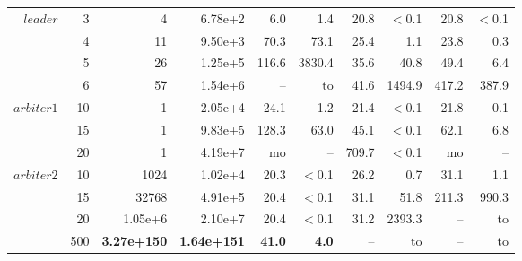 \begin{tabular}{|r|r|r|r|r| r|r|r|r|r|}
\hline
\multirow{4}{*}{$leader$} &3  &4  &6.78e+2        &6.0    &1.4        &20.8   &$<$0.1     &20.8   &$<$0.1 \\
                          &4  &11 &9.50e+3        &70.3   &73.1       &25.4   &1.1        &23.8   &0.3  \\
                          &5  &26 &1.25e+5        &116.6  &3830.4     &35.6   &40.8       &49.4   &6.4  \\
                          &6  &57 &1.54e+6        &--     &to         &41.6   &1494.9     &417.2  &387.9 \\
\hline
\multirow{3}{*}{$arbiter1$} &10 &1  &2.05e+4        &24.1   &1.2        &21.4   &$<$0.1     &21.8   &0.1 \\
                            &15 &1  &9.83e+5        &128.3  &63.0       &45.1   &$<$0.1     &62.1   &6.8 \\
                            &20 &1  &4.19e+7        &mo     &--         &709.7  &$<$0.1     &mo     &--  \\
\hline
\multirow{4}{*}{$arbiter2$} 	&10 	& 1024          & 1.02e+4           &20.3       &$<$0.1     &26.2       &0.7        &31.1       & 1.1   \\
                        	&15 	& 32768         & 4.91e+5           &20.4       &$<$0.1     &31.1       &51.8       &211.3  & 990.3     \\
                        	&20 	& 1.05e+6       & 2.10e+7           &20.4       &$<$0.1     &31.2       &2393.3     & --        & to    \\
                        	&500 	&\textbf{3.27e+150}        & \textbf{1.64e+151}        &\textbf{41.0}      &\textbf{4.0}       &--         &to         &--         & to   \\
\hline
\end{tabular}

\vfill
